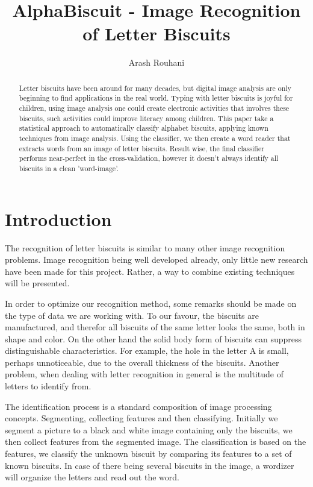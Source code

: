 \documentclass[a4paper,11pt]{article}
\title{AlphaBiscuit - Image Recognition of Letter Biscuits}
\author{Arash Rouhani}
\begin{document}
\maketitle

\begin{abstract}
    Letter biscuits have been around for many decades, but digital image
analysis are only beginning to find applications in the real world.
Typing with letter biscuits is joyful for children, using image analysis
one could create electronic activities that involves these biscuits,
such activities could improve literacy among children. This paper take
a statistical approach to automatically classify alphabet biscuits,
applying known techniques from image analysis. Using the classifier, we
then create a word reader that extracts words from an image of letter
biscuits.
Result wise, the final classifier performs near-perfect in the cross-validation,
however it doesn't always identify all biscuits in a clean 'word-image'.

\end{abstract}

\section{Introduction}
The recognition of letter biscuits is similar to many other image recognition problems.
Image recognition being well developed already, only little new research have been made for this project.
Rather, a way to combine existing techniques will be presented.

In order to optimize our recognition method, some remarks should be made on the type of data we are working with.
To our favour, the biscuits are manufactured, and therefor all biscuits
of the same letter looks the same, both in shape and color.  On the
other hand the solid body form of biscuits can suppress distinguishable
characteristics. For example, the hole in the letter A is small, perhaps
unnoticeable, due to the overall thickness of the biscuits. Another
problem, when dealing with letter recognition in general is the multitude
of letters to identify from.

The identification process is a standard composition of image processing
concepts. Segmenting, collecting features and then classifying.
Initially we segment a picture to a black and white image containing
only the biscuits, we then collect features from the segmented image.
The classification is based on the features, we classify the unknown
biscuit by comparing its features to a set of known biscuits.  In case
of there being several biscuits in the image, a wordizer will organize
the letters and read out the word.
\end{document}
